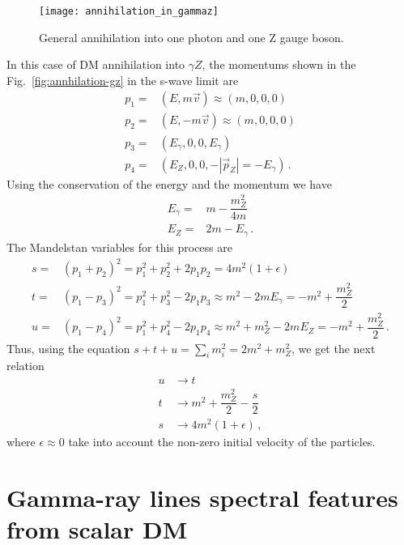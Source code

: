 \begin{figure}[h]
\begin{center}
\texttt{[image: annihilation\_in\_gammaz]}
\end{center}
\caption{General annihilation into one photon and one Z gauge boson.}
\label{fig:annhilation-gz}
\end{figure}
%
In this case of DM annihilation into $\gamma Z$, the momentums shown in the Fig.~\eqref{fig:annhilation-gz} in the s-wave limit are
\begin{align}
p_1=&(E,m\vec{v})\approx(m,0,0,0)\nonumber\\
p_2=&(E,-m\vec{v})\approx(m,0,0,0)\nonumber\\
p_3=&(E_{\gamma},0,0,E_{\gamma})\nonumber\\
p_4=&(E_{Z},0,0,-|\vec{p}_{Z}|=-E_{\gamma})\,.
\end{align}
Using the conservation of the energy and the momentum we have
\begin{align}
E_{\gamma}=&m-\dfrac{m_{Z}^2}{4m}\nonumber\\
E_{Z}=&2m-E_{\gamma}\,.
\end{align}
%
The Mandelstan variables for this process are
\begin{align}
s=&(p_1+p_2)^2=p_1^2+p_2^2+2p_1p_2 = 4m^2(1+\epsilon)\nonumber\\
t=&(p_1-p_3)^2=p_1^2+p_3^2-2p_1p_3\approx m^2-2mE_{\gamma}=-m^2+\dfrac{m_Z^2}{2}\nonumber\\
u=&(p_1-p_4)^2=p_1^2+p_4^2-2p_1p_4\approx m^2+m_{Z}^2-2mE_{Z}=-m^2+\dfrac{m_Z^2}{2}\,.
\end{align}
%
Thus, using the equation $s+t+u=\sum_im_i^2=2m^2+m_Z^2$, we get the next relation 
\begin{align}
u&\rightarrow t \nonumber\\
t&\rightarrow m^2+\dfrac{m_Z^2}{2}-\dfrac{s}{2} \nonumber\\
s&\rightarrow 4m^2(1+\epsilon)\,,
\end{align}
where $\epsilon\approx 0$ take into account the non-zero initial velocity of the particles.







\section{Gamma-ray lines spectral features from scalar DM}

